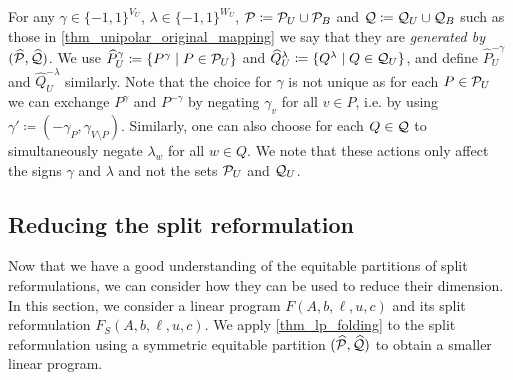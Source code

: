 \documentclass[pdflatex,sn-mathphys-num]{sn-jnl}%
\theoremstyle{thmstyleone}%
\theoremstyle{thmstylethree}%
\theoremstyle{thmstyletwo}%
\begin{document}
For any $\gamma\in \{-1,1\}^{V_U}$, $\lambda\in \{-1,1\}^{W_U}$, $\MP \coloneqq \MP_U \cup \MP_B$ and $\MQ\coloneqq \MQ_U \cup \MQ_B$ such as those in \cref{thm_unipolar_original_mapping} we say that they are \emph{generated by} $(\widehat{\mathcal{P}},\widehat{\mathcal{Q}})$.
We use $\widehat{P}^\gamma_U \coloneqq \{ P^\gamma \mid P \in \MP_U\}$ and $\widehat{Q}^\lambda_U \coloneqq \{ Q^\lambda \mid Q \in \MQ_U\}$, and define $\widehat{P}^{-\gamma}_U$ and $\widehat{Q}^{-\lambda}_U$ similarly.
Note that the choice for $\gamma$ is not unique as for each $P\in \mathcal{P}_U$ we can exchange $P^{\gamma}$ and $P^{-\gamma}$ by negating $\gamma_v$ for all $v\in P$, i.e. by using $\gamma' \coloneqq (-\gamma_P,\gamma_{V\setminus P})$. Similarly, one can also choose for each $Q\in \mathcal{Q}$ to simultaneously negate $\lambda_{w}$ for all $w\in Q$. We note that these actions only affect the signs $\gamma$ and $\lambda$ and not the sets $\mathcal{P}_U$ and $\mathcal{Q}_U$. 

\subsection{Reducing the split reformulation}

Now that we have a good understanding of the equitable partitions of split reformulations, we can consider how they can be used to reduce their dimension. 
In this section, we consider a linear program $F(A,b,\ell,u,c)$ and its split reformulation $F_S(A,b,\ell,u,c)$. We apply \cref{thm_lp_folding} to the split reformulation using a symmetric equitable partition $(\widehat{\mathcal{P}},\widehat{\mathcal{Q}})$ to obtain a smaller linear program.\\
\end{document}
